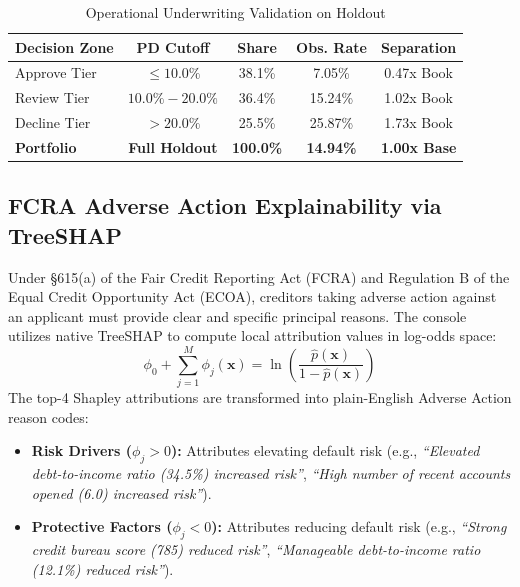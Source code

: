 \documentclass[conference]{IEEEtran}
\begin{document}
\begin{table}[htbp]
\caption{Operational Underwriting Validation on Holdout}
\label{tab:zones}
\centering
\small
\begin{tabular}{lcccc}
\toprule
\textbf{Decision Zone} & \textbf{PD Cutoff} & \textbf{Share} & \textbf{Obs. Rate} & \textbf{Separation} \\
\midrule
Approve Tier & $\le 10.0\%$ & 38.1\% & 7.05\% & 0.47x Book \\
Review Tier & $10.0\%-20.0\%$ & 36.4\% & 15.24\% & 1.02x Book \\
Decline Tier & $> 20.0\%$ & 25.5\% & 25.87\% & 1.73x Book \\
\midrule
\textbf{Portfolio} & \textbf{Full Holdout} & \textbf{100.0\%} & \textbf{14.94\%} & \textbf{1.00x Base} \\
\bottomrule
\end{tabular}
\end{table}

\subsection{FCRA Adverse Action Explainability via TreeSHAP}
Under \S615(a) of the Fair Credit Reporting Act (FCRA) and Regulation B of the Equal Credit Opportunity Act (ECOA), creditors taking adverse action against an applicant must provide clear and specific principal reasons. The console utilizes native TreeSHAP to compute local attribution values in log-odds space:
\begin{equation}
\phi_0 + \sum_{j=1}^M \phi_j(\mathbf{x}) = \ln \left( \frac{\hat{p}(\mathbf{x})}{1 - \hat{p}(\mathbf{x})} \right)
\end{equation}
The top-4 Shapley attributions are transformed into plain-English Adverse Action reason codes:
\begin{itemize}
    \item \textbf{Risk Drivers ($\phi_j > 0$):} Attributes elevating default risk (e.g., \textit{``Elevated debt-to-income ratio (34.5\%) increased risk''}, \textit{``High number of recent accounts opened (6.0) increased risk''}).
    \item \textbf{Protective Factors ($\phi_j < 0$):} Attributes reducing default risk (e.g., \textit{``Strong credit bureau score (785) reduced risk''}, \textit{``Manageable debt-to-income ratio (12.1\%) reduced risk''}).
\end{itemize}
\end{document}
